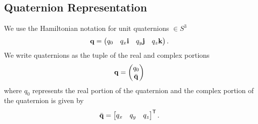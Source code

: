 
\subsection{Quaternion Representation}

We use the Hamiltonian notation for unit quaternions $\in S^3$
\begin{equation}
  \q=\begin{pmatrix}q_{0} & q_{x}\vect{i} & q_{y} \vect{j} & q_{z} \vect{k} \end{pmatrix}.%
\end{equation}
We write quaternions as the tuple of the real and complex portions
\begin{equation}
	\boldsymbol{\mathrm{q}} = \begin{pmatrix} q_0 \\ \bar{\boldsymbol{\mathrm{q}}} \end{pmatrix}
\end{equation}
where $q_0$ represents the real portion of the quaternion and the complex
portion of the quaternion is given by
\begin{equation}
	\bar{\boldsymbol{\mathrm{q}}} = \begin{bmatrix} q_x & q_y & q_z \end{bmatrix} ^{\mathsf{T}}.
\end{equation}

